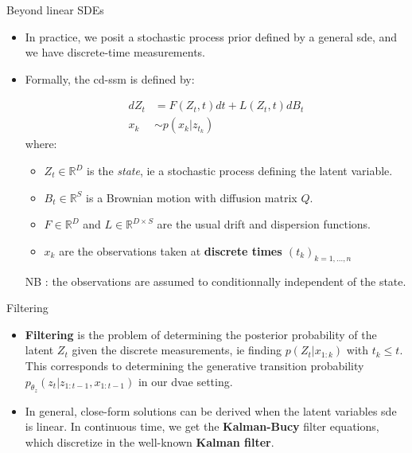 \begin{frame}{Beyond linear SDEs}
    \begin{itemize}
        \item In practice, we posit a stochastic process prior defined by a general \gls{sde}, and we have discrete-time measurements.
        \item Formally, the \gls{cd-ssm} is defined by:
            \begin{tcolorbox}[colback=blue!5!white,colframe=black!75!black,title=Continuous-Discrete State Space model]
                \begin{align}
                    dZ_t &= F(Z_t, t)dt + L(Z_t,t) dB_t \\
                    x_k &\sim p(x_k \vert z_{t_k})
                \end{align}
                where:
                \begin{itemize}
                    \item $Z_t \in \mathbb{R}^{D}$ is the \textit{state}, ie a stochastic process defining the latent variable.
                    \item $B_t \in \mathbb{R}^{S}$ is a Brownian motion with diffusion matrix $Q$.
                    \item $F \in \mathbb{R}^{D}$ and $L \in \mathbb{R}^{D \times S}$ are the usual drift and dispersion functions.
                    \item $x_k$ are the observations taken at \textbf{discrete times $(t_k)_{k=1,...,n}$}
                \end{itemize}
                NB : the observations are assumed to conditionnally independent of the state.
            \end{tcolorbox}
    \end{itemize}
\end{frame}

\begin{frame}{Filtering}
    \begin{itemize}
        \item \textbf{Filtering} is the problem of determining the posterior probability of the latent $Z_t$ given the 
discrete measurements, ie finding $p(Z_t \vert x_{1:k})$ with $t_k \leq t$. This corresponds to 
determining the generative transition probability $p_{\theta_z}(z_t \vert z_{1:t-1}, x_{1:t-1})$ in our 
\gls{dvae} setting.
        \item In general, close-form solutions can be derived when the latent variables \gls{sde} is linear. In continuous 
time, we get the \textbf{Kalman-Bucy} filter equations, which discretize in the well-known \textbf{Kalman filter}.
    \end{itemize}
\end{frame}

